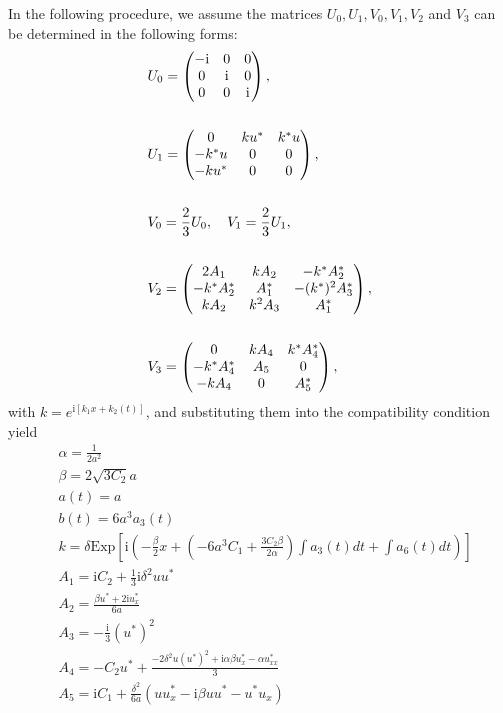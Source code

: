 \documentclass[12pt]{article}
\begin{document}
In the following procedure, we assume the matrices $U_{0}, U_{1}, V_{0}, V_{1}, V_{2}$ and $V_{3}$ can be determined in the following forms:
\begin{align}
  & U_{0} = \begin{pmatrix}
             -\mathrm{i} & 0 & 0 \\
              0 & \mathrm{i} & 0 \\
              0 & 0 & \mathrm{i}
            \end{pmatrix}, \label{4} \\ \notag\\
  & U_{1} = \begin{pmatrix}
              0 & ku^{*} & k^{*}u \\
              -k^{*}u & 0 & 0 \\
              -ku^{*} & 0 & 0
            \end{pmatrix}, \label{5} \\ \notag\\
  & V_{0} = \frac{2}{3}U_{0}, \quad V_{1} = \frac{2}{3}U_{1}, \\ \notag\\
  & V_{2} = \begin{pmatrix}
              2A_{1} & kA_{2} & -k^{*}A_{2}^{*} \\
              -k^{*}A_{2}^{*} & A_{1}^{*} & -(k^{*})^{2}A_{3}^{*} \\
              kA_{2} & k^{2}A_{3} & A_{1}^{*}
            \end{pmatrix}, \\ \notag\\
  & V_{3} = \begin{pmatrix}
              0 & kA_{4} & k^{*}A_{4}^{*} \\
              -k^{*}A_{4}^{*} & A_{5} & 0 \\
              -kA_{4} & 0 & A_{5}^{*}
            \end{pmatrix}, \label{8}
\end{align}
with $k=e^{\mathrm{i}[k_{1}x + k_{2}(t)]}$, and substituting them into the compatibility condition yield
\begin{align}
  & \alpha = \frac{1}{2a^{2}} \\
  & \beta = 2\sqrt{3C_{2}}a \\
  & a(t) = a \\
  & b(t) = 6a^{3}a_{3}(t) \\
  & k = \delta \mathrm{Exp}\left[\mathrm{i}\left(-\frac{\beta}{2}x + \left( -6a^{3}C_{1} + \frac{3C_{2}\beta}{2\alpha}\right) \int a_{3}(t)dt + \int a_{6}(t)dt \right)\right] \\
  & A_{1} = \mathrm{i}C_{2} + \frac{1}{3}\mathrm{i}\delta^{2}uu^{*} \\
  & A_{2} = \frac{\beta u^{*} + 2\mathrm{i}u^{*}_{x}}{6a} \\
  & A_{3} = -\frac{\mathrm{i}}{3}(u^{*})^{2} \\
  & A_{4} = -C_{2}u^{*} + \frac{- 2\delta^{2}u(u^{*})^{2} + \mathrm{i}\alpha\beta u^{*}_{x} - \alpha u^{*}_{xx}}{3}  \\
  & A_{5} = \mathrm{i}C_{1} + \frac{\delta^{2}}{6a}(uu^{*}_{x} - \mathrm{i}\beta uu^{*} - u^{*}u_{x})
\end{align}
\end{document}
